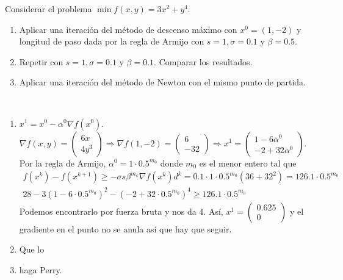 \documentclass[twoside]{article}
\begin{document}
\newpage
\begin{ejercicio}{6}
Considerar el problema $\min f(x,y)=3x^2+y^4$.
\begin{enumerate}
\item Aplicar una iteración del método de descenso máximo con $x^0=(1,-2)$ y longitud de paso dada por la regla de Armijo con $s=1,\sigma=0.1$ y $\beta=0.5$. 
\item Repetir con $s=1,\sigma=0.1$ y $\beta=0.1$. Comparar los resultados.
\item Aplicar una iteración del método de Newton con el mismo punto de partida.
\end{enumerate}
\end{ejercicio}
\begin{solucion}\
\begin{enumerate}
\item $x^1=x^0-\alpha^0\nabla f(x^0)$. $\nabla f(x,y)=\begin{pmatrix}
6x\\
4y^3
\end{pmatrix}\Rightarrow \nabla f(1,-2)=\begin{pmatrix}
6\\
-32
\end{pmatrix}\Rightarrow x^1=\begin{pmatrix}
1-6\alpha^0\\
-2+32\alpha^0
\end{pmatrix}$. Por la regla de Armijo, $\alpha^0=1\cdot 0.5^{m_0}$ donde $m_0$ es el menor entero tal que
\begin{gather*}
f(x^k)-f(x^{k+1})\geq -\sigma s\beta^{m_k}\nabla f(x^k)d^k =0.1\cdot 1 \cdot 0.5^{m_0}(36+32^2)=126.1\cdot0.5^{m_0}\\
28 - 3(1-6\cdot 0.5^{m_0})^2-(-2+32\cdot 0.5^{m_0})^4 \geq  126.1\cdot0.5^{m_0}
\end{gather*}
Podemos encontrarlo por fuerza bruta y nos da 4. Así, $x^1=\begin{pmatrix}
0.625\\
0
\end{pmatrix}$ y el gradiente en el punto no se anula así que hay que seguir.
\item Que lo 
\item haga Perry.
\end{enumerate}
\end{solucion}

\newpage
\end{document}
